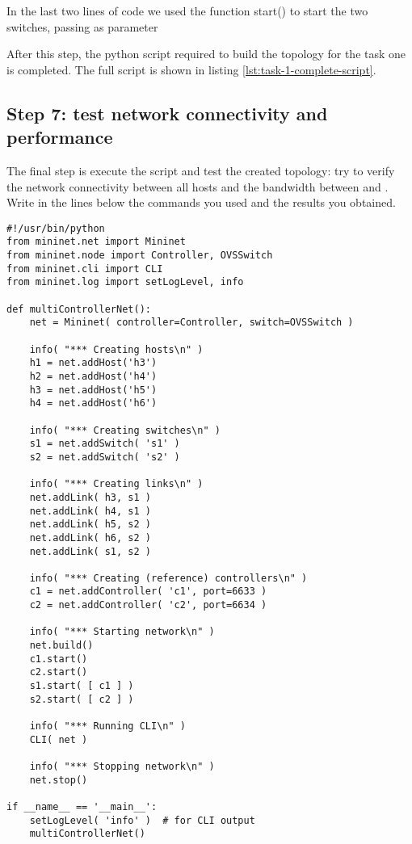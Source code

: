 In the last two lines of code we used the function start() to start the two switches,
passing as parameter

After this step, the python script required to build the topology for the task one
is completed. The full script is shown in listing \ref{lst:task-1-complete-script}.



\subsection{Step 7: test network connectivity and performance}
The final step is execute the script and test the created topology: try to verify
the network connectivity between all hosts and the bandwidth between  and .
Write in the lines below the commands you used and the results you obtained.

\hrulefill

\hrulefill

\hrulefill

\begin{lstlisting}[label=lst:task-1-complete-script, caption=Task 1 complete python script]
#!/usr/bin/python
from mininet.net import Mininet
from mininet.node import Controller, OVSSwitch
from mininet.cli import CLI
from mininet.log import setLogLevel, info

def multiControllerNet():
    net = Mininet( controller=Controller, switch=OVSSwitch )

    info( "*** Creating hosts\n" )
    h1 = net.addHost('h3')
    h2 = net.addHost('h4')
    h3 = net.addHost('h5')
    h4 = net.addHost('h6')

    info( "*** Creating switches\n" )
    s1 = net.addSwitch( 's1' )
    s2 = net.addSwitch( 's2' )

    info( "*** Creating links\n" )
    net.addLink( h3, s1 )
    net.addLink( h4, s1 )
    net.addLink( h5, s2 )
    net.addLink( h6, s2 )
    net.addLink( s1, s2 )

    info( "*** Creating (reference) controllers\n" )
    c1 = net.addController( 'c1', port=6633 )
    c2 = net.addController( 'c2', port=6634 )

    info( "*** Starting network\n" )
    net.build()
    c1.start()
    c2.start()
    s1.start( [ c1 ] )
    s2.start( [ c2 ] )

    info( "*** Running CLI\n" )
    CLI( net )

    info( "*** Stopping network\n" )
    net.stop()

if __name__ == '__main__':
    setLogLevel( 'info' )  # for CLI output
    multiControllerNet()
\end{lstlisting}

